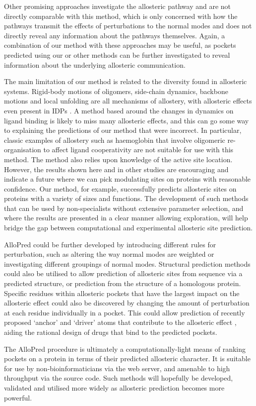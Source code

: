 Other promising approaches \cite{Demerdash2009, Kidd2009, Kaya2013} investigate the allosteric pathway and are not directly comparable with this method, which is only concerned with how the pathways transmit the effects of perturbations to the normal modes and does not directly reveal any information about the pathways themselves.
Again, a combination of our method with these approaches may be useful, as pockets predicted using our or other methods can be further investigated to reveal information about the underlying allosteric communication.

The main limitation of our method is related to the diversity found in allosteric systems.
Rigid-body motions of oligomers, side-chain dynamics, backbone motions and local unfolding are all mechanisms of allostery, with allosteric effects even present in IDPs \cite{Motlagh2014}.
A method based around the changes in dynamics on ligand binding is likely to miss many allosteric effects, and this can go some way to explaining the predictions of our method that were incorrect.
In particular, classic examples of allostery such as haemoglobin that involve oligomeric re-organisation to affect ligand cooperativity are not suitable for use with this method.
The method also relies upon knowledge of the active site location.
However, the results shown here and in other studies are encouraging and indicate a future where we can pick modulating sites on proteins with reasonable confidence.
Our method, for example, successfully predicts allosteric sites on proteins with a variety of sizes and functions.
The development of such methods that can be used by non-specialists without extensive parameter selection, and where the results are presented in a clear manner allowing exploration, will help bridge the gap between computational and experimental allosteric site prediction.

AlloPred could be further developed by introducing different rules for perturbation, such as altering the way normal modes are weighted or investigating different groupings of normal modes.
Structural prediction methods \cite{Kelley2015} could also be utilised to allow prediction of allosteric sites from sequence via a predicted structure, or prediction from the structure of a homologous protein.
Specific residues within allosteric pockets that have the largest impact on the allosteric effect could also be discovered by changing the amount of perturbation at each residue individually in a pocket.
This could allow prediction of recently proposed `anchor' and `driver' atoms that contribute to the allosteric effect \cite{Nussinov2014}, aiding the rational design of drugs that bind to the predicted pockets.

The AlloPred procedure is ultimately a computationally-light means of ranking pockets on a protein in terms of their predicted allosteric character.
It is suitable for use by non-bioinformaticians via the web server, and amenable to high throughput via the source code.
Such methods will hopefully be developed, validated and utilised more widely as allosteric prediction becomes more powerful.
